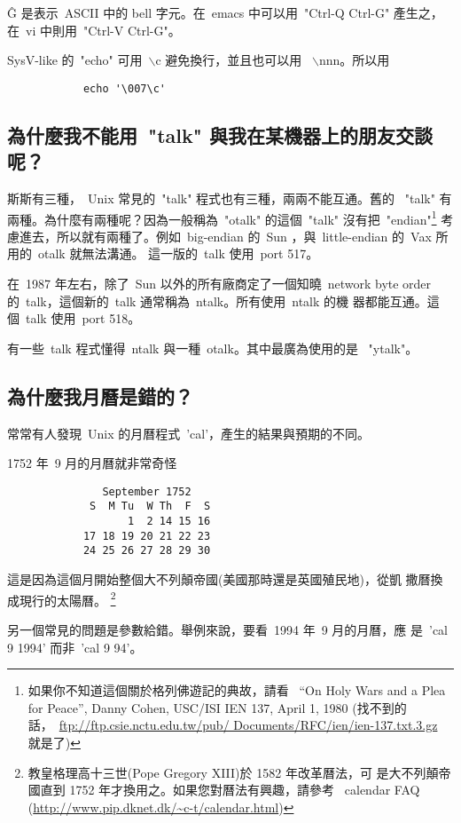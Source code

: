 \documentclass{article}
\begin{document}
\begin{CJK*}{Bg5}{ming}
	\^G 是表示~ASCII 中的 bell 字元。在~emacs 中可以用~"Ctrl-Q Ctrl-G" 
	產生之，在~vi 中則用~"Ctrl-V Ctrl-G"。

	SysV-like 的~"echo" 可用~$\backslash$c 避免換行，並且也可以用
	~$\backslash$nnn。所以用
\begin{verbatim}
	        echo '\007\c'
\end{verbatim}

\subsection{為什麼我不能用~"talk" 與我在某機器上的朋友交談呢？}

	斯斯有三種，~Unix 常見的~"talk" 程式也有三種，兩兩不能互通。舊的 
	~"talk" 有兩種。為什麼有兩種呢？因為一般稱為~"otalk" 的這個~"talk" 
	沒有把~"endian"\footnote{如果你不知道這個關於格列佛遊記的典故，請看
	~``On Holy Wars and a Plea for Peace'', Danny Cohen, USC/ISI IEN 137, 
	April 1, 1980 (找不到的話，~\url{ftp://ftp.csie.nctu.edu.tw/pub/
	Documents/RFC/ien/ien-137.txt.3.gz} 就是了)} 考慮進去，所以就有兩種了。例如~big-endian 的~Sun 
	，與~little-endian 的~Vax 所用的~otalk 就無法溝通。 這一版的~talk 
	使用~port 517。

	在~1987 年左右，除了~Sun 以外的所有廠商定了一個知曉~network byte 
	order 的~talk，這個新的~talk 通常稱為~ntalk。所有使用~ntalk 的機
	器都能互通。這個~talk 使用~port 518。

	有一些~talk 程式懂得~ntalk 與一種~otalk。其中最廣為使用的是 
	~"ytalk"。

\subsection{為什麼我月曆是錯的？}

	常常有人發現~Unix 的月曆程式~'cal'，產生的結果與預期的不同。

	1752 年~9 月的月曆就非常奇怪
\begin{verbatim}
               September 1752
             S  M Tu  W Th  F  S
                   1  2 14 15 16
            17 18 19 20 21 22 23
            24 25 26 27 28 29 30
\end{verbatim}
	這是因為這個月開始整個大不列顛帝國(美國那時還是英國殖民地)，從凱
	撒曆換成現行的太陽曆。
	\footnote{教皇格理高十三世(Pope Gregory XIII)於 1582 年改革曆法，可
        是大不列顛帝國直到 1752 年才換用之。如果您對曆法有興趣，請參考 
	~calendar FAQ (\url{http://www.pip.dknet.dk/~c-t/calendar.html})}

	另一個常見的問題是參數給錯。舉例來說，要看~1994 年~9 月的月曆，應
	是~'cal 9 1994' 而非~'cal 9 94'。 
\end{CJK*}
\end{document}

